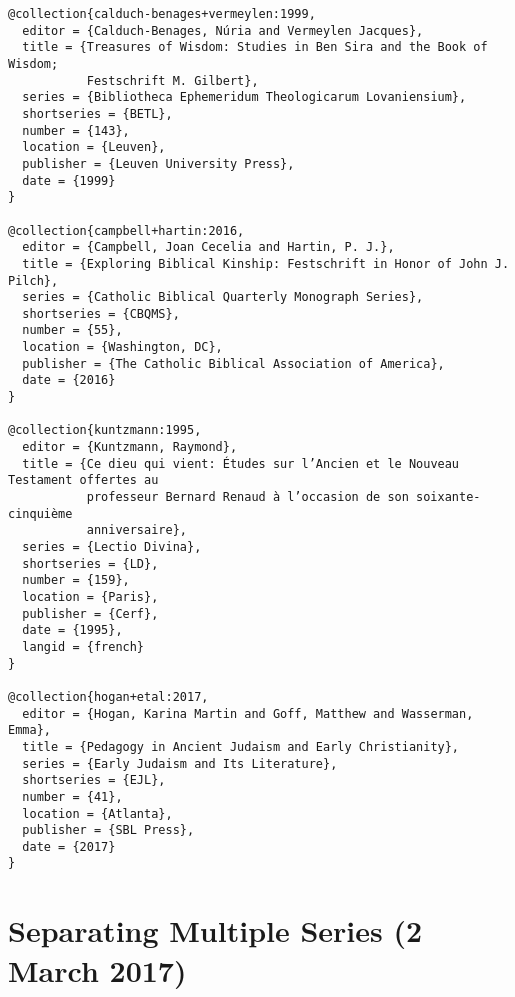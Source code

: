 \documentclass[a4paper]{article}
\begin{document}
\begin{verbatim}
@collection{calduch-benages+vermeylen:1999,
  editor = {Calduch-Benages, Núria and Vermeylen Jacques},
  title = {Treasures of Wisdom: Studies in Ben Sira and the Book of Wisdom;
           Festschrift M. Gilbert},
  series = {Bibliotheca Ephemeridum Theologicarum Lovaniensium},
  shortseries = {BETL},
  number = {143},
  location = {Leuven},
  publisher = {Leuven University Press},
  date = {1999}
}

@collection{campbell+hartin:2016,
  editor = {Campbell, Joan Cecelia and Hartin, P. J.},
  title = {Exploring Biblical Kinship: Festschrift in Honor of John J. Pilch},
  series = {Catholic Biblical Quarterly Monograph Series},
  shortseries = {CBQMS},
  number = {55},
  location = {Washington, DC},
  publisher = {The Catholic Biblical Association of America},
  date = {2016}
}

@collection{kuntzmann:1995,
  editor = {Kuntzmann, Raymond},
  title = {Ce dieu qui vient: Études sur l’Ancien et le Nouveau Testament offertes au
           professeur Bernard Renaud à l’occasion de son soixante-cinquième
           anniversaire},
  series = {Lectio Divina},
  shortseries = {LD},
  number = {159},
  location = {Paris},
  publisher = {Cerf},
  date = {1995},
  langid = {french}
}

@collection{hogan+etal:2017,
  editor = {Hogan, Karina Martin and Goff, Matthew and Wasserman, Emma},
  title = {Pedagogy in Ancient Judaism and Early Christianity},
  series = {Early Judaism and Its Literature},
  shortseries = {EJL},
  number = {41},
  location = {Atlanta},
  publisher = {SBL Press},
  date = {2017}
}
\end{verbatim}

\begin{verbcite}
  \nocite{calduch-benages+vermeylen:1999, campbell+hartin:2016,
    kuntzmann:1995, hogan+etal:2017}
\end{verbcite}
\exampleabbreviations
\examplebibliography
{}

\section{Separating Multiple Series (2 March 2017)}
\end{document}
